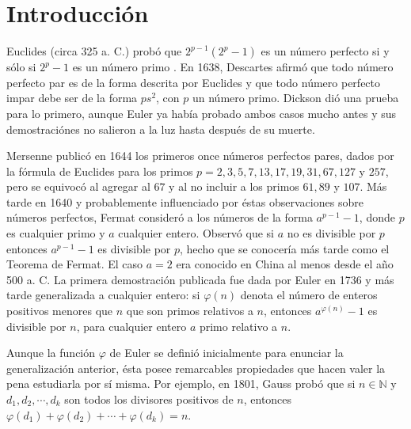 \section*{Introducción}

Euclides (circa 325 a. C.) probó que $2^{p-1}(2^p-1)$ es un número perfecto si y sólo si $2^p-1$ es un número primo \cite{Di1}. En 1638, Descartes afirmó que todo número perfecto par es de la forma descrita por Euclides y que todo número perfecto impar debe ser de la forma $ps^2$, con $p$ un número primo. Dickson \cite{Di1} dió una prueba para lo primero, aunque Euler ya había probado ambos casos mucho antes y sus demostraciónes no salieron a la luz hasta después de su muerte.
\bigskip

Mersenne publicó en 1644 los primeros once números perfectos pares, dados por la fórmula de Euclides para los primos $p=2,3,5,7,13,17,19,31,67,127$ y $257$, pero se equivocó al agregar al $67$ y al no incluir a los primos $61,89$ y $107$. Más tarde en 1640 y probablemente influenciado por éstas observaciones sobre números perfectos, Fermat consideró a los números de la forma $a^{p-1}-1$, donde $p$ es cualquier primo y $a$ cualquier entero. Observó que si $a$ no es divisible por $p$ entonces $a^{p-1}-1$ es divisible por $p$, hecho que se conocería más tarde como el Teorema de Fermat. El caso $a=2$ era conocido en China al menos desde el año 500 a. C. La primera demostración publicada fue dada por Euler en 1736 y más tarde generalizada a cualquier entero: si $\varphi(n)$ denota el número de enteros positivos menores que $n$ que son primos relativos a $n$, entonces $a^{\varphi(n)}-1$ es divisible por $n$, para cualquier entero $a$ primo relativo a $n$.
\bigskip

Aunque la función $\varphi$ de Euler se definió inicialmente para enunciar la generalización anterior, ésta posee remarcables propiedades que hacen valer la pena estudiarla por sí misma. Por ejemplo, en 1801, Gauss probó que si $n\in\mathbb{N}$ y $d_1,d_2,\cdots,d_k$ son todos los divisores positivos de $n$, entonces $\varphi(d_1)+\varphi(d_2)+\cdots+\varphi(d_k)=n$.
